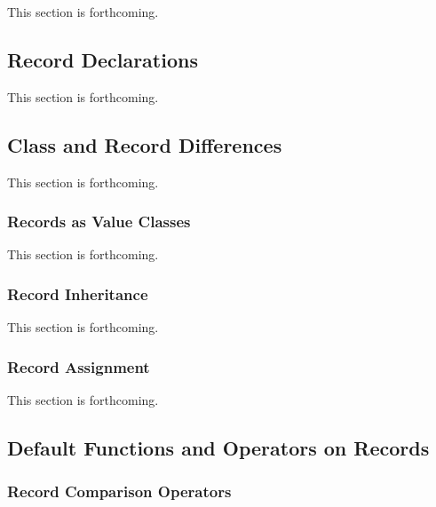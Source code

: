 \label{Records}

This section is forthcoming.

\subsection{Record Declarations}
\label{Record_Declarations}

This section is forthcoming.

\subsection{Class and Record Differences}
\label{Class_and_Record_Differences}

This section is forthcoming.

\subsubsection{Records as Value Classes}
\label{Records_as_Value_Classes}

This section is forthcoming.

\subsubsection{Record Inheritance}
\label{Record_Inheritance}

This section is forthcoming.

\subsubsection{Record Assignment}
\label{Record_Assignment}

This section is forthcoming.

\subsection{Default Functions and Operators on Records}

\subsubsection{Record Comparison Operators}
\label{Record_Comparison_Operators}
